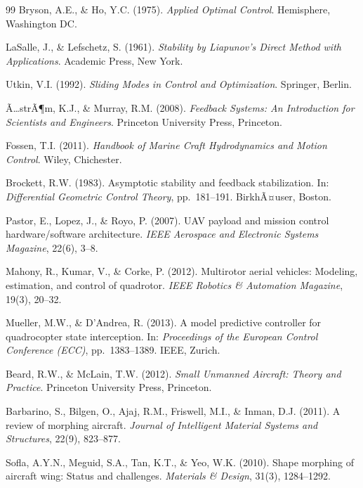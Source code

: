 ﻿\documentclass[12pt,a4paper]{article}
\theoremstyle{remark}
\begin{document}
\begin{thebibliography}{99}
		Bryson, A.E., \& Ho, Y.C. (1975). \textit{Applied Optimal Control}. Hemisphere, Washington DC.

		LaSalle, J., \& Lefschetz, S. (1961). \textit{Stability by Liapunov's Direct Method with Applications}. Academic Press, New York.

		Utkin, V.I. (1992). \textit{Sliding Modes in Control and Optimization}. Springer, Berlin.

		Ã…strÃ¶m, K.J., \& Murray, R.M. (2008). \textit{Feedback Systems: An Introduction for Scientists and Engineers}. Princeton University Press, Princeton.

		Fossen, T.I. (2011). \textit{Handbook of Marine Craft Hydrodynamics and Motion Control}. Wiley, Chichester.

		Brockett, R.W. (1983). Asymptotic stability and feedback stabilization. In: \textit{Differential Geometric Control Theory}, pp.~181--191. BirkhÃ¤user, Boston.


		Pastor, E., Lopez, J., \& Royo, P. (2007). UAV payload and mission control hardware/software architecture. \textit{IEEE Aerospace and Electronic Systems Magazine}, 22(6), 3--8.

		Mahony, R., Kumar, V., \& Corke, P. (2012). Multirotor aerial vehicles: Modeling, estimation, and control of quadrotor. \textit{IEEE Robotics \& Automation Magazine}, 19(3), 20--32.

		Mueller, M.W., \& D'Andrea, R. (2013). A model predictive controller for quadrocopter state interception. In: \textit{Proceedings of the European Control Conference (ECC)}, pp.~1383--1389. IEEE, Zurich.

		Beard, R.W., \& McLain, T.W. (2012). \textit{Small Unmanned Aircraft: Theory and Practice}. Princeton University Press, Princeton.


		Barbarino, S., Bilgen, O., Ajaj, R.M., Friswell, M.I., \& Inman, D.J. (2011). A review of morphing aircraft. \textit{Journal of Intelligent Material Systems and Structures}, 22(9), 823--877.

		Sofla, A.Y.N., Meguid, S.A., Tan, K.T., \& Yeo, W.K. (2010). Shape morphing of aircraft wing: Status and challenges. \textit{Materials \& Design}, 31(3), 1284--1292.


\end{thebibliography}
\end{document}
